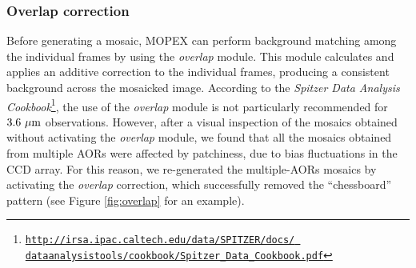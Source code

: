 \documentclass[preprint2]{emulateapj}
\begin{document}
\subsubsection{Overlap correction}
Before generating a mosaic, MOPEX can perform background matching among the individual frames
by using the \emph{overlap} module. 
This module calculates and applies an additive correction to the individual frames,
producing a consistent background across the mosaicked image.
According to the \emph{Spitzer Data Analysis 
Cookbook}\footnote{\href{http://irsa.ipac.caltech.edu/data/SPITZER/docs/dataanalysistools/cookbook/Spitzer_Data_Cookbook.pdf}
{\tt http://irsa.ipac.caltech.edu/data/SPITZER/docs/ dataanalysistools/cookbook/Spitzer\_Data\_Cookbook.pdf}}, 
the use of the \emph{overlap} module is not particularly recommended for 
$3.6~\rm \mu m$ observations. 
However, after a visual inspection of the mosaics obtained without activating the \emph{overlap} module,
we found that all the mosaics obtained from multiple AORs were affected by patchiness, 
due to bias fluctuations in the CCD array.
For this reason, we re-generated the multiple-AORs mosaics by activating the \emph{overlap} correction,
which successfully removed the ``chessboard'' pattern (see Figure \ref{fig:overlap} for an example).
\end{document}
